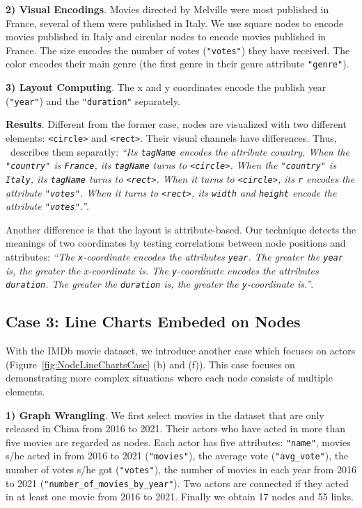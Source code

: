 \textbf{2) Visual Encodings}.
Movies directed by Melville were most published in France, several of them were published in Italy.
We use square nodes to encode movies published in Italy and circular nodes to encode movies published in France.
The size encodes the number of votes (\texttt{"votes"}) they have received.
The color encodes their main genre (the first genre in their genre attribute \texttt{"genre"}).

\textbf{3) Layout Computing}.
The x and y coordinates encode the publish year (\texttt{"year"}) and the \texttt{"duration"} separately.

\textbf{Results}.
Different from the former case, nodes are visualized with two different elements: \texttt{<circle>} and \texttt{<rect>}.
Their visual channels have differences.
Thus, \ApproachName~describes them separatly:
\textit{``Its \texttt{tagName} encodes the attribute country.
When the \texttt{"country"} is \texttt{France}, its \texttt{tagName} turns to \texttt{<circle>}.
When the \texttt{"country"} is \texttt{Italy}, its \texttt{tagName} turns to \texttt{<rect>}.
When it turns to \texttt{<circle>}, 
its \texttt{r} encodes the attribute \texttt{"votes"}.
When it turns to \texttt{<rect>}, its \texttt{width} and \texttt{height} encode the attribute \texttt{"votes"}.''}.

Another difference is that the layout is attribute-based.
Our technique detects the meanings of two coordinates by testing correlations between node positions and attributes: 
\textit{``The \texttt{x}-coordinate encodes the attributes \texttt{year}. 
The greater the \texttt{year} is, the greater the x-coordinate is.
The \texttt{y}-coordinate encodes the attributes \texttt{duration}.
The greater the \texttt{duration} is, the greater the \texttt{y}-coordinate is.''}.

\subsection{Case 3: Line Charts Embeded on Nodes}
With the IMDb movie dataset, we introduce another case which focuses on actors (Figure~\ref{fig:NodeLineChartsCase} (b) and (f)).
This case focuses on demonstrating more complex situations where each node consists of multiple elements.

\textbf{1) Graph Wrangling}. We first select movies in the dataset that are only released in China from 2016 to 2021.
Their actors who have acted in more than five movies are regarded as nodes.
Each actor has five attributes: \texttt{"name"}, movies s/he acted in from 2016 to 2021 (\texttt{"movies"}), the average vote (\texttt{"avg\_vote"}), the number of votes s/he got (\texttt{"votes"}), the number of movies in each year from 2016 to 2021 (\texttt{"number\_of\_movies\_by\_year"}).
Two actors are connected if they acted in at least one movie from 2016 to 2021.
Finally we obtain 17 nodes and 55 links.

